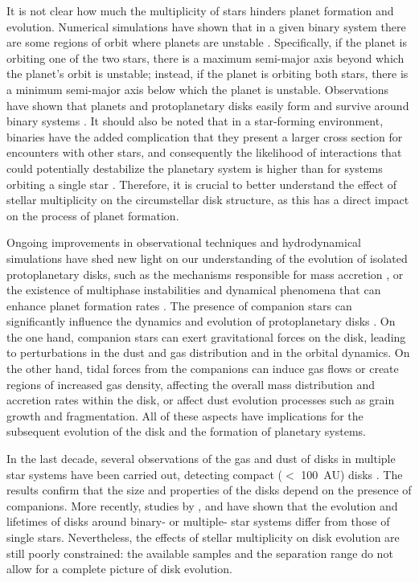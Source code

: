 \documentclass{aa}
\begin{document}
It is not clear how much the multiplicity of stars hinders planet formation and evolution. Numerical simulations have shown that in a given binary system there are some regions of orbit where planets are unstable \citep{Holman99}. Specifically, if the planet is orbiting one of the two stars, there is a maximum semi-major axis beyond which the planet's orbit is unstable; instead, if the planet is orbiting both stars, there is a minimum semi-major axis below which the planet is unstable.  Observations have shown that planets and protoplanetary disks easily form and survive around binary systems \citep{Duchene10, Bonavita07}. It should also be noted that in a star-forming environment, binaries have the added complication that they present a larger cross section for encounters with other stars, and consequently the likelihood of interactions that could potentially destabilize the planetary system is higher than for systems orbiting a single star \citep{Adams06}. Therefore, it is crucial to better understand the effect of stellar multiplicity on the circumstellar disk structure, as this has a direct impact on the process of planet formation. \par
Ongoing improvements in observational techniques and hydrodynamical simulations have shed new light on our understanding of the evolution of isolated protoplanetary disks, such as the mechanisms responsible for mass accretion \citep{Espaillat22}, or the existence of multiphase instabilities and dynamical phenomena that can enhance planet formation rates \citep{Lesur22}. The presence of companion stars can significantly influence the dynamics and evolution of protoplanetary disks \citep{Pinte23}. On the one hand, companion stars can exert gravitational forces on the disk, leading to perturbations in the dust and gas distribution and in the orbital dynamics. On the other hand, tidal forces from the companions can induce gas flows or create regions of increased gas density, affecting the overall mass distribution and accretion rates within the disk, or affect dust evolution processes such as grain growth and fragmentation. All of these aspects have implications for the subsequent evolution of the disk and the formation of planetary systems. \par
In the last decade, several observations of the gas and dust of disks in multiple star systems have been carried out, detecting compact ($<$ 100~AU) disks \citep[e.g.,][]{Rota22, Zagaria21, Zurlo21, Akeson19, Manara19, Cox17, Harris_2012}. The results confirm that the size and properties of the disks depend on the presence of companions. More recently, studies by \cite{Zagaria23}, \cite{Zhang23} and \cite{Zagaria21} have shown that the evolution and lifetimes of disks around binary- or multiple- star systems differ from those of single stars. Nevertheless, the effects of stellar multiplicity on disk evolution are still poorly constrained: the available samples and the separation range do not allow for a complete picture of disk evolution. \par
\end{document}
